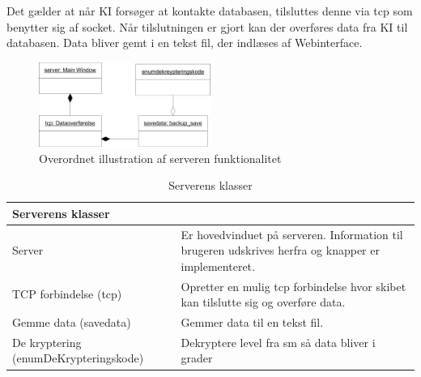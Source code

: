 Det gælder at når KI forsøger at kontakte databasen, tilsluttes denne via tcp som benytter sig af socket. Når tilslutningen er gjort kan der overføres data fra KI til databasen. Data bliver gemt i en tekst fil, der indlæses af Webinterface.
\begin{figure}[H]
\centering
\includegraphics[width = 0.5\textwidth]{billeder/database_server}
\caption{Overordnet illustration af serveren funktionalitet}
\label{fig:database_server}
\end{figure}

\begin{table}[H]
\centering
{}
\begin{tabular}{| p{3cm}  p{12cm}|}
\multicolumn{2}{l}{{\Large Serverens klasser}} \\\hline

Server & Er hovedvinduet på serveren. Information til brugeren udskrives herfra og knapper er implementeret. \\\hline
TCP forbindelse (tcp) & Opretter en mulig tcp forbindelse hvor skibet kan tilslutte sig og overføre data.\\\hline
Gemme data (savedata) & Gemmer data til en tekst fil.\\\hline
De kryptering (enumDeKrypteringskode) & Dekryptere level fra sm så data bliver i grader\\\hline
\end{tabular}
\caption{Serverens klasser}
\label{tabel:server-klasser}
\end{table}

